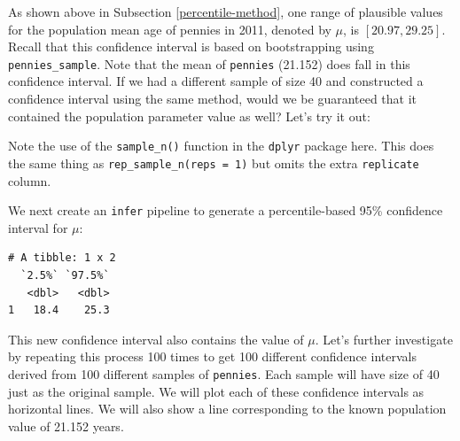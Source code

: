 \documentclass[12pt,]{krantz}
\makeatletter
\newenvironment{Shaded}{\begin{snugshade}}{\end{snugshade}}
\newcommand{\KeywordTok}[1]{\textcolor[rgb]{0.27,0.27,0.27}{\textbf{#1}}}
\newcommand{\DataTypeTok}[1]{\textcolor[rgb]{0.27,0.27,0.27}{#1}}
\newcommand{\DecValTok}[1]{\textcolor[rgb]{0.06,0.06,0.06}{#1}}
\newcommand{\StringTok}[1]{\textcolor[rgb]{0.5,0.5,0.5}{#1}}
\newcommand{\OtherTok}[1]{\textcolor[rgb]{0.37,0.37,0.37}{#1}}
\newcommand{\OperatorTok}[1]{\textcolor[rgb]{0.43,0.43,0.43}{\textbf{#1}}}
\newcommand{\NormalTok}[1]{#1}
\newenvironment{kframe}{%
\medskip{}
\setlength{\fboxsep}{.8em}
 \def\at@end@of@kframe{}%
 \ifinner\ifhmode%
  \def\at@end@of@kframe{\end{minipage}}%
  \begin{minipage}{\columnwidth}%
 \fi\fi%
 \def\FrameCommand##1{\hskip\@totalleftmargin \hskip-\fboxsep
 \colorbox{shadecolor}{##1}\hskip-\fboxsep
     \hskip-\linewidth \hskip-\@totalleftmargin \hskip\columnwidth}%
 \MakeFramed {\advance\hsize-\width
   \@totalleftmargin\z@ \linewidth\hsize
   \@setminipage}}%
 {\par\unskip\endMakeFramed%
 \at@end@of@kframe}
\renewenvironment{Shaded}{\begin{kframe}}{\end{kframe}}
\makeatother
\begin{document}
As shown above in Subsection \ref{percentile-method}, one range of
plausible values for the population mean age of pennies in 2011, denoted
by \(\mu\), is \([20.97, 29.25]\). Recall that this confidence interval
is based on bootstrapping using \texttt{pennies\_sample}. Note that the
mean of \texttt{pennies} (21.152) does fall in this confidence interval.
If we had a different sample of size 40 and constructed a confidence
interval using the same method, would we be guaranteed that it contained
the population parameter value as well? Let's try it out:

\begin{Shaded}
\end{Shaded}

Note the use of the \texttt{sample\_n()} function in the \texttt{dplyr}
package here. This does the same thing as
\texttt{rep\_sample\_n(reps\ =\ 1)} but omits the extra
\texttt{replicate} column.

We next create an \texttt{infer} pipeline to generate a percentile-based
95\% confidence interval for \(\mu\):

\begin{Shaded}
\end{Shaded}

\begin{verbatim}
# A tibble: 1 x 2
  `2.5%` `97.5%`
   <dbl>   <dbl>
1   18.4    25.3
\end{verbatim}

This new confidence interval also contains the value of \(\mu\). Let's
further investigate by repeating this process 100 times to get 100
different confidence intervals derived from 100 different samples of
\texttt{pennies}. Each sample will have size of 40 just as the original
sample. We will plot each of these confidence intervals as horizontal
lines. We will also show a line corresponding to the known population
value of 21.152 years.
\end{document}
